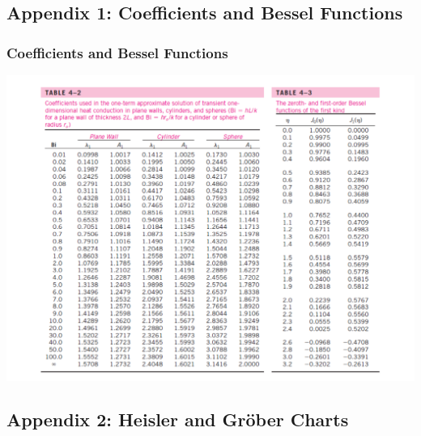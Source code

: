 \documentclass[10pt,compress]{beamer}
\begin{document}
\subsection{Appendix 1: Coefficients and Bessel Functions}\label{appendix1}
\begin{frame}
 \frametitle{Coefficients and Bessel Functions}
        \begin{center}
          \includegraphics[width=.9\columnwidth,height=.65\columnwidth,clip]{./Pics/BaselFunctionTable}
        \end{center}
\end{frame}




\subsection{Appendix 2: Heisler and Gr\"ober Charts}\label{appendix2}
{
  
}
\end{document}
